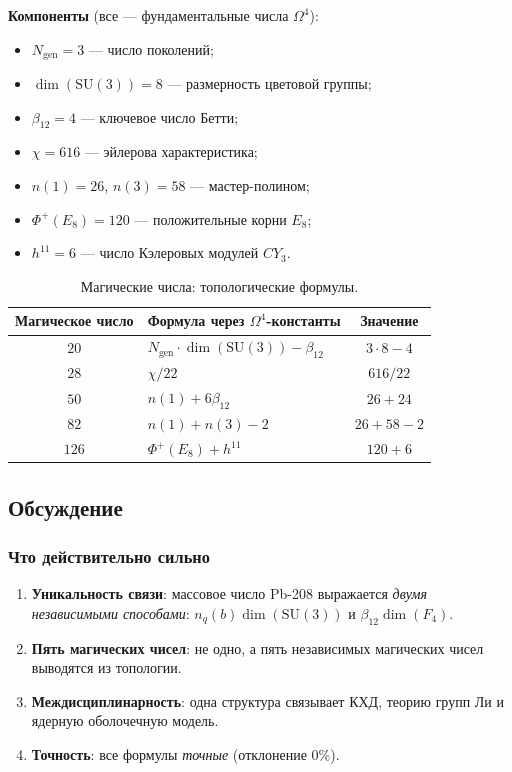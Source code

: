 \documentclass[11pt,a4paper]{article}
\newcommand{\SU}{\ensuremath{\mathrm{SU}}}
\newcommand{\CY}{\ensuremath{CY_3}}
\newcommand{\Om}{\ensuremath{\Omega^4}}
\newcommand{\Ngen}{\ensuremath{N_{\text{gen}}}}
\theoremstyle{definition}
\begin{document}
\medskip\noindent
\textbf{Компоненты} (все --- фундаментальные числа $\Om$):
\begin{itemize}
    \item $\Ngen = 3$ --- число поколений;
    \item $\dim(\SU(3)) = 8$ --- размерность цветовой группы;
    \item $\beta_{12} = 4$ --- ключевое число Бетти;
    \item $\chi = 616$ --- эйлерова характеристика;
    \item $n(1) = 26$, $n(3) = 58$ --- мастер-полином;
    \item $\Phi^+(E_8) = 120$ --- положительные корни $E_8$;
    \item $h^{11} = 6$ --- число Кэлеровых модулей $\CY$.
\end{itemize}

\begin{table}[ht]
\centering
\caption{Магические числа: топологические формулы.}
\label{tab:magic-numbers}
\begin{tabular}{clc}
\toprule
Магическое число & Формула через $\Om$-константы & Значение \\
\midrule
$20$  & $\Ngen \cdot \dim(\SU(3)) - \beta_{12}$ & $3 \cdot 8 - 4$ \\
$28$  & $\chi / 22$                             & $616/22$ \\
$50$  & $n(1) + 6 \beta_{12}$                   & $26 + 24$ \\
$82$  & $n(1) + n(3) - 2$                       & $26 + 58 - 2$ \\
$126$ & $\Phi^+(E_8) + h^{11}$                  & $120 + 6$ \\
\bottomrule
\end{tabular}
\end{table}

\subsection{Обсуждение}
\label{subsec:nuclear-discussion}

\subsubsection{Что действительно сильно}

\begin{enumerate}
    \item \textbf{Уникальность связи}: массовое число Pb-208
          выражается \emph{двумя независимыми способами}:
          $n_q(b) \dim(\SU(3))$ и $\beta_{12} \dim(F_4)$.
    \item \textbf{Пять магических чисел}: не одно, а пять
          независимых магических чисел выводятся из топологии.
    \item \textbf{Междисциплинарность}: одна структура связывает
          КХД, теорию групп Ли и ядерную оболочечную модель.
    \item \textbf{Точность}: все формулы \emph{точные} (отклонение 0\%).
\end{enumerate}
\end{document}
